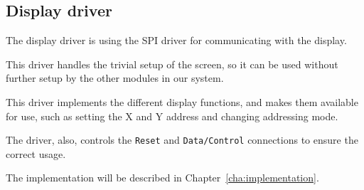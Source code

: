 \subsection{Display driver}

The display driver is using the SPI driver for communicating with the display. 

This driver handles the trivial setup of the screen, so it can be used without further setup by the other modules in our system.

This driver implements the different display functions, and makes them available for use, such as setting the X and Y address and changing addressing mode. 

The driver, also, controls the \texttt{Reset} and \texttt{Data/Control} connections to ensure the correct usage.

The implementation will be described in Chapter~\ref{cha:implementation}.
